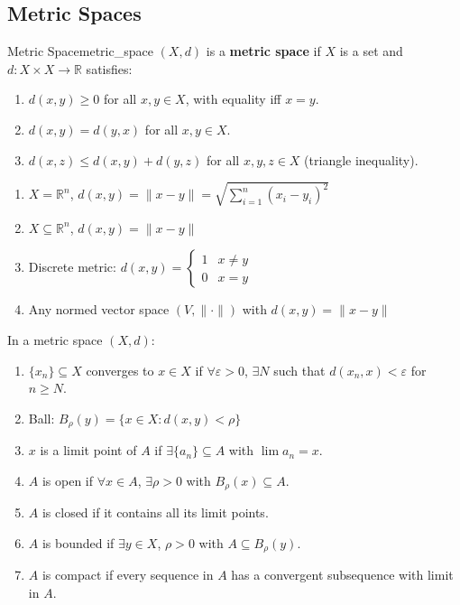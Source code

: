 \documentclass[11pt, letterpaper, openany]{book}
\begin{document}
\subsection{Metric Spaces}

\begin{defn}{Metric Space}{metric_space}
$(X, d)$ is a \textbf{metric space} if $X$ is a set and $d: X \times X \to \mathbb{R}$ satisfies:
\begin{enumerate}
    \item[(M1)] $d(x, y) \geq 0$ for all $x, y \in X$, with equality iff $x = y$.
    \item[(M2)] $d(x, y) = d(y, x)$ for all $x, y \in X$.
    \item[(M3)] $d(x, z) \leq d(x, y) + d(y, z)$ for all $x, y, z \in X$ (triangle inequality).
\end{enumerate}
\end{defn}

\begin{example}
\begin{enumerate}
    \item $X = \mathbb{R}^n$, $d(x, y) = \|x - y\| = \sqrt{\sum_{i=1}^n (x_i - y_i)^2}$
    \item $X \subseteq \mathbb{R}^n$, $d(x, y) = \|x - y\|$
    \item Discrete metric: $d(x, y) = \begin{cases} 1 & x \neq y \\ 0 & x = y \end{cases}$
    \item Any normed vector space $(V, \|\cdot\|)$ with $d(x, y) = \|x - y\|$
\end{enumerate}
\end{example}

\begin{remark}
In a metric space $(X, d)$:
\begin{enumerate}
    \item $\{x_n\} \subseteq X$ converges to $x \in X$ if $\forall \varepsilon > 0$, $\exists N$ such that $d(x_n, x) < \varepsilon$ for $n \geq N$.
    \item Ball: $B_\rho(y) = \{x \in X : d(x, y) < \rho\}$
    \item $x$ is a limit point of $A$ if $\exists \{a_n\} \subseteq A$ with $\lim a_n = x$.
    \item $A$ is open if $\forall x \in A$, $\exists \rho > 0$ with $B_\rho(x) \subseteq A$.
    \item $A$ is closed if it contains all its limit points.
    \item $A$ is bounded if $\exists y \in X$, $\rho > 0$ with $A \subseteq B_\rho(y)$.
    \item $A$ is compact if every sequence in $A$ has a convergent subsequence with limit in $A$.
\end{enumerate}
\end{remark}
\end{document}
